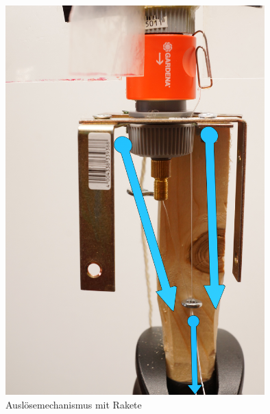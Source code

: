 \begin{figure}[!h]
\centering
\includegraphics[width=10cm]{figs/rakete/ausloesemechanismus.png}
\caption{Auslösemechanismus mit Rakete}\label{fig:ausloeser}
\end{figure}